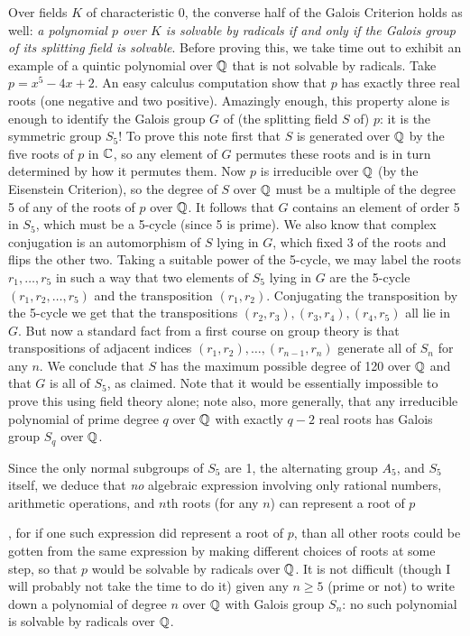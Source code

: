{Over fields $K$ of characteristic 0, the converse half of the Galois Criterion holds as well:  {\sl a polynomial $p$ over $K$ is solvable by radicals if and only if the Galois group of its splitting field is solvable}.  Before proving this, we take time out to exhibit an example of a quintic polynomial over
$\Bbb Q$ that is not solvable by radicals.  Take $p= x^5 - 4x + 2$.  An easy calculus computation show that $p$ has exactly three real roots (one negative and two positive).  Amazingly enough, this property alone is enough to identify the Galois group $G$ of (the splitting field $S$ of) $p$:  it is the symmetric group $S_5$!  To prove this note first that $S$ is generated over $\Bbb Q$ by the five roots of $p$ in $\Bbb C$, so any element of $G$ permutes these roots and is in turn determined by how it permutes them.  Now $p$ is irreducible over $\Bbb Q$ (by the Eisenstein Criterion), so the degree of $S$ over $\Bbb Q$ must be a multiple of the degree 5 of any of the roots of $p$ over $\Bbb Q$.  It follows that $G$ contains an element of order 5 in $S_5$, which must be a 5-cycle (since 5 is prime).  We also know that complex conjugation is an automorphism of $S$ lying in $G$, which fixed 3 of the roots and flips the other two.  Taking a suitable power of the 5-cycle, we may label the roots
$r_1,\ldots,r_5$ in such a way that two elements of $S_5$ lying in $G$ are the 5-cycle
$(r_1, r_2,\ldots,r_5)$ and the transposition $(r_1,r_2)$.  Conjugating the transposition by the 5-cycle we get that the transpositions $(r_2,r_3),(r_3,r_4),(r_4,r_5)$ all lie in $G$.  But now a standard fact from a first course on group theory is that transpositions of adjacent indices
$(r_1,r_2),\ldots,(r_{n-1},r_n)$ generate all of $S_n$ for any $n$.  We conclude that $S$ has the maximum possible degree of 120 over $\Bbb Q$ and that $G$ is all of $S_5$, as claimed.  Note that it would be essentially impossible to prove this using field theory alone; note also, more generally, that any irreducible polynomial of prime degree $q$ over $\Bbb Q$ with exactly $q-2$ real roots has Galois group $S_q$ over $\Bbb Q$.

Since the only normal subgroups of $S_5$ are 1, the alternating group $A_5$, and $S_5$ itself, we deduce that {\sl no} algebraic expression involving only rational numbers, arithmetic operations, and $n$th roots (for any $n$) can represent a root of $p$}, for if one such expression did represent a root of $p$, than all other roots could be gotten from the same expression by making different choices of roots at some step, so that $p$ would be solvable by radicals over $\Bbb Q$.  It is not difficult (though I will probably not take the time to do it) given any $n\ge5$ (prime or not) to write down a polynomial of degree $n$ over $\Bbb Q$ with Galois group $S_n$:  no such polynomial is solvable by radicals over $\Bbb Q$. 